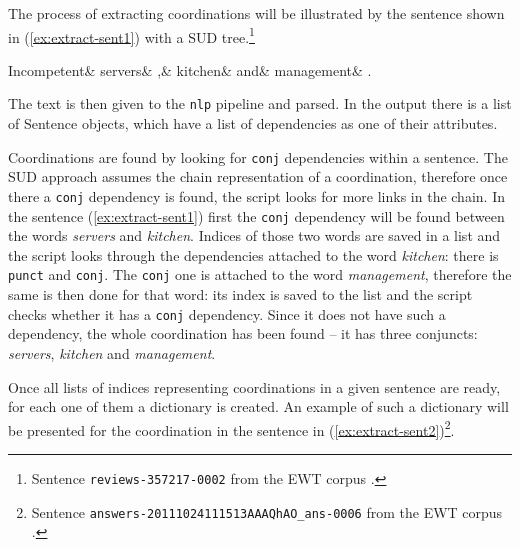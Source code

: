 The process of extracting coordinations will be illustrated by the sentence shown in (\ref{ex:extract-sent1}) with a SUD tree.\footnote{Sentence \texttt{reviews-357217-0002} from the EWT corpus \citep{silveira14gold}.}

\begin{exe}
\ex
\label{ex:extract-sent1}
\begin{dependency}
	\begin{deptext}
		 Incompetent\& servers\& ,\& kitchen\& and\& management\& .\\
	 \end{deptext} 
\end{dependency}
\end{exe}

The text is then given to the \texttt{nlp} pipeline and parsed. In the output there is a list of Sentence objects, which have a list of dependencies as one of their attributes. 

Coordinations are found by looking for \texttt{conj} dependencies within a sentence. The SUD approach assumes the chain representation of a coordination, therefore once there a \texttt{conj} dependency is found, the script looks for more links in the chain. In the sentence (\ref{ex:extract-sent1}) first the \texttt{conj} dependency will be found between the words \textsl{servers} and \textsl{kitchen}. Indices of those two words are saved in a list and the script looks through the dependencies attached to the word \textsl{kitchen}: there is \texttt{punct} and \texttt{conj}. The \texttt{conj} one is attached to the word \textsl{management}, therefore the same is then done for that word: its index is saved to the list and the script checks whether it has a \texttt{conj} dependency. Since it does not have such a dependency, the whole coordination has been found -- it has three conjuncts: \textsl{servers}, \textsl{kitchen} and \textsl{management}. 

Once all lists of indices representing coordinations in a given sentence are ready, for each one of them a dictionary is created. An example of such a dictionary will be presented for the coordination in the sentence in (\ref{ex:extract-sent2})\footnote{Sentence \texttt{answers-20111024111513AAAQhAO\_ans-0006} from the EWT corpus \citep{silveira14gold}.}.

